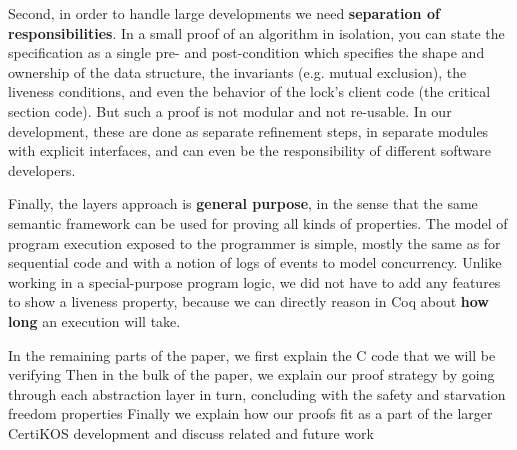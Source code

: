 Second, in order to handle large developments we need {\bf separation of responsibilities}. In a small proof of an algorithm in isolation, you can state the specification as a single pre- and post-condition which specifies the shape and ownership of the data structure, the invariants (e.g. mutual exclusion), the liveness conditions, and even the behavior of the lock's client code (the critical section code). But such a proof is not modular and not re-usable. In our development, these are done as separate refinement steps, in separate modules with explicit interfaces, and can even be the responsibility of different software developers. 

Finally, the layers approach is {\bf general purpose}, in the sense
that the same semantic framework can be used for proving all kinds of
properties. The model of program execution exposed to the programmer
is simple, mostly the same as for sequential code and with a notion of logs of events to model concurrency.
Unlike working in a special-purpose program logic, we 
did not have to add any features to show a liveness property, because we can directly reason in Coq about \textbf{how long} an execution will take. 

In the remaining parts of the paper, we first explain the C code that we will be verifying 
Then in the bulk of the paper, we explain our proof strategy by going through each abstraction layer in turn, concluding with the safety and starvation freedom properties Finally we explain how our proofs fit as a part of the larger CertiKOS development and discuss related and future work









